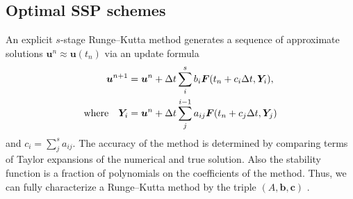 \subsection{Optimal SSP schemes}\label{subsec:Optimal_SSPRK}
An explicit $s$-stage Runge--Kutta method generates a sequence of approximate solutions $\bm{u}^n \approx \bm{u}(t_n)$ via an update formula
\begin{align*}
	\bm{u}^{n+1} &= \bm{u}^{n} + \Delta t \sum_i^s b_i \bm{F}(t_n + c_i \Delta t,\bm{Y}_i), \\
	\text{where} \quad \bm{Y}_i &= \bm{u}^{n} + \Delta t \sum_j^{i-1} a_{ij} \bm{F}(t_n + c_j \Delta t,\bm{Y}_j)
\end{align*}
and $c_i = \sum_j^sa_{ij}$. 
The accuracy of the method is determined by comparing terms of Taylor 
expansions of the numerical and true solution. 
Also the stability function is a fraction of polynomials on the coefficients of
the method.
Thus, we can fully characterize a Runge--Kutta method by the triple 
$(A,\bm{b},\bm{c})$ \cite{Butcher2008_book}.

